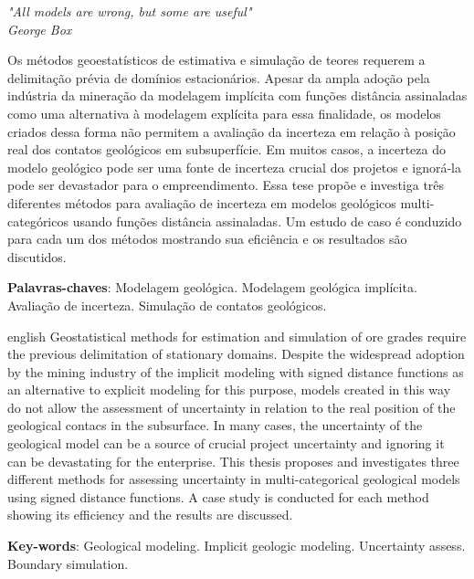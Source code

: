 \documentclass[
    oneside, %
	12pt,				%
	a4paper,			%
	chapter=TITLE,		%
	english,			%
	french,				%
	spanish,			%
	brazil				%
	]{abntex2}
\begin{document}
\begin{epigrafe}
    \vspace*{\fill}
	\begin{flushright}
		\textit{"All models are wrong, but some are useful"\\
		George Box}
	\end{flushright}
\end{epigrafe}


\setlength{\absparsep}{18pt} %
\begin{resumo}
    Os métodos geoestatísticos de estimativa e simulação de teores requerem a delimitação prévia de domínios estacionários. Apesar da ampla adoção pela indústria da mineração da modelagem implícita com funções distância assinaladas como uma alternativa à modelagem explícita para essa finalidade, os modelos criados dessa forma não permitem a avaliação da incerteza em relação à posição real dos contatos geológicos em subsuperfície. Em muitos casos, a incerteza do modelo geológico pode ser uma fonte de incerteza crucial dos projetos e ignorá-la pode ser devastador para o empreendimento. Essa tese propõe e investiga três diferentes métodos para avaliação de incerteza em modelos geológicos multi-categóricos usando funções distância assinaladas. Um estudo de caso é conduzido para cada um dos métodos mostrando sua eficiência e os resultados são discutidos.


 \textbf{Palavras-chaves}: Modelagem geológica. Modelagem geológica implícita. Avaliação de incerteza. Simulação de contatos geológicos.
\end{resumo}

\begin{resumo}[Abstract]
 \begin{otherlanguage*}{english}
   Geostatistical methods for estimation and simulation of ore grades require the previous delimitation of stationary domains. Despite the widespread adoption by the mining industry of the implicit modeling with signed distance functions as an alternative to explicit modeling for this purpose, models created in this way do not allow the assessment of uncertainty in relation to the real position of the geological contacs in the subsurface. In many cases, the uncertainty of the geological model can be a source of crucial project uncertainty and ignoring it can be devastating for the enterprise. This thesis proposes and investigates three different methods for assessing uncertainty in multi-categorical geological models using signed distance functions. A case study is conducted for each method showing its efficiency and the results are discussed.

   \vspace{\onelineskip}
 
   \noindent 
   \textbf{Key-words}: Geological modeling. Implicit geologic modeling. Uncertainty assess. Boundary simulation.
 \end{otherlanguage*}
\end{resumo}
\end{document}

